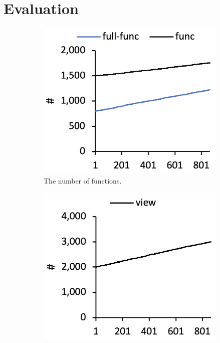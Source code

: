 \section{Evaluation}\label{sec:eval}

\begin{figure}
  \centering
  \begin{subfigure}[b]{0.24\textwidth}
    \includegraphics[width=\textwidth]{img/func}
    \caption{The number of functions.}
  \end{subfigure}
  \begin{subfigure}[b]{0.24\textwidth}
    \includegraphics[width=\textwidth]{img/view}

\end{subfigure}
\end{figure}
